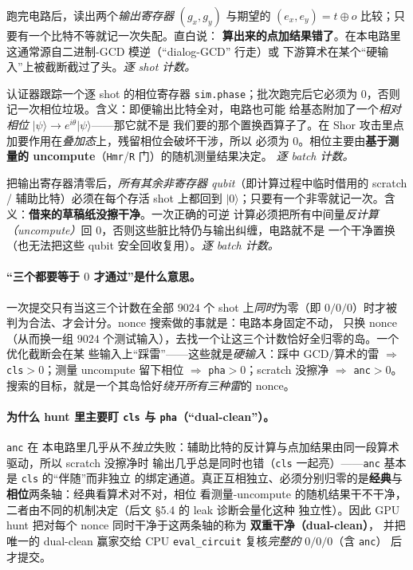 \documentclass[11pt]{ctexart}
\let\c\lstinline
\begin{document}
\begin{description}[leftmargin=2.2em,style=nextline]
  \item[\texttt{cls}（classical mismatch，经典失配）] 跑完电路后，读出两个\emph{输出寄存器}
  $(g_x,g_y)$ 与期望的 $(e_x,e_y)=t\oplus o$ 比较；只要有一个比特不等就记一次失配。直白说：
  \textbf{算出来的点加结果错了}。在本电路里这通常源自二进制-GCD 模逆（``dialog-GCD'' 行走）或
  下游算术在某个``硬输入''上被截断截过了头。\emph{逐 shot 计数。}
  \item[\texttt{pha}（phase-garbage，相位垃圾）] 认证器跟踪一个逐 shot 的相位寄存器
  \c{sim.phase}；批次跑完后它必须为 $0$，否则记一次相位垃圾。含义：即便输出比特全对，电路也可能
  给基态附加了一个\emph{相对相位} $\lvert\psi\rangle\to e^{i\theta}\lvert\psi\rangle$——那它就不是
  我们要的那个置换酉算子了。在 Shor 攻击里点加要作用在\emph{叠加态}上，残留相位会破坏干涉，所以
  必须为 $0$。相位主要由\textbf{基于测量的 uncompute}（\c{Hmr}/\c{R} 门）的随机测量结果决定。
  \emph{逐 batch 计数。}
  \item[\texttt{anc}（ancilla-garbage，辅助比特垃圾）] 把输出寄存器清零后，\emph{所有其余非寄存器
  qubit}（即计算过程中临时借用的 scratch / 辅助比特）必须在每个存活 shot 上都回到
  $\lvert 0\rangle$；只要有一个非零就记一次。含义：\textbf{借来的草稿纸没擦干净}。一次正确的可逆
  计算必须把所有中间量\emph{反计算（uncompute）}回 $0$，否则这些脏比特仍与输出纠缠，电路就不是
  一个干净置换（也无法把这些 qubit 安全回收复用）。\emph{逐 batch 计数。}
\end{description}

\paragraph{``三个都要等于 $0$ 才通过''是什么意思。}一次提交只有当这三个计数在全部 $9024$ 个 shot
上\emph{同时}为零（即 $0/0/0$）时才被判为合法、才会计分。nonce 搜索做的事就是：电路本身固定不动，
只换 nonce（从而换一组 $9024$ 个测试输入），去找一个让这三个计数恰好全归零的岛。一个优化截断会在某
些输入上``踩雷''——这些就是\emph{硬输入}：踩中 GCD/算术的雷 $\Rightarrow$ \texttt{cls}$>0$；测量
uncompute 留下相位 $\Rightarrow$ \texttt{pha}$>0$；scratch 没擦净 $\Rightarrow$ \texttt{anc}$>0$。
搜索的目标，就是一个其岛恰好\emph{绕开所有三种雷}的 nonce。

\paragraph{为什么 hunt 里主要盯 \texttt{cls} 与 \texttt{pha}（``dual-clean''）。}\texttt{anc} 在
本电路里几乎从不\emph{独立}失败：辅助比特的反计算与点加结果由同一段算术驱动，所以 scratch 没擦净时
输出几乎总是同时也错（\texttt{cls} 一起亮）——\texttt{anc} 基本是 \texttt{cls} 的``伴随''而非独立
的绑定通道。真正互相独立、必须分别归零的是\textbf{经典}与\textbf{相位}两条轴：经典看算术对不对，相位
看测量-uncompute 的随机结果干不干净，二者由不同的机制决定（后文 \S 5.4 的 leak 诊断会量化这种
独立性）。因此 GPU hunt 把对每个 nonce 同时干净于这两条轴的称为 \textbf{双重干净（dual-clean）}，
并把唯一的 dual-clean 赢家交给 CPU \c{eval_circuit} 复核\emph{完整的} $0/0/0$（含 \texttt{anc}）
后才提交。
\end{document}
